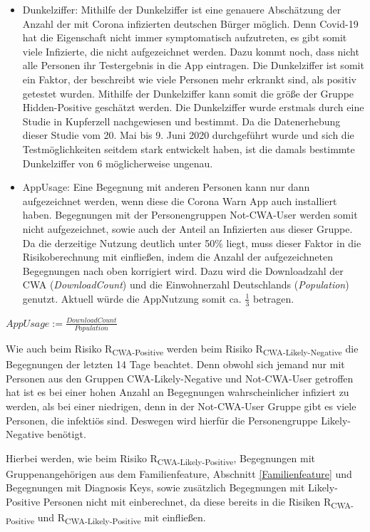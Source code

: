 \documentclass[conference,compsoc]{IEEEtran}
\begin{document}
\begin{itemize}
	\item Dunkelziffer: Mithilfe der Dunkelziffer ist eine genauere Abschätzung der Anzahl der mit Corona infizierten deutschen Bürger möglich. 
	Denn Covid-19 hat die Eigenschaft nicht immer symptomatisch aufzutreten, es gibt somit viele Infizierte, 
	die nicht aufgezeichnet werden. Dazu kommt noch, dass nicht alle Personen ihr Testergebnis in die App eintragen.
	Die Dunkelziffer ist somit  ein Faktor, der beschreibt wie viele Personen mehr erkrankt sind, 
	als positiv getestet wurden. Mithilfe der Dunkelziffer kann somit die größe der Gruppe Hidden-Positive geschätzt werden.
	Die Dunkelziffer wurde erstmals durch eine Studie in Kupferzell \cite{Dunkelziffer} nachgewiesen und bestimmt. 
	Da die Datenerhebung dieser Studie vom 20. Mai bis 9. Juni 2020 durchgeführt wurde und sich die Testmöglichkeiten seitdem stark entwickelt haben, 
	ist die damals bestimmte Dunkelziffer von 6 möglicherweise ungenau. 
	\item  AppUsage: Eine Begegnung mit anderen Personen kann nur dann aufgezeichnet werden, wenn diese die Corona Warn App auch installiert haben. 
	Begegnungen mit der Personengruppen Not-CWA-User werden somit nicht aufgezeichnet, sowie auch der Anteil an Infizierten aus dieser Gruppe. 
	Da die derzeitige Nutzung deutlich unter 50\% liegt, muss dieser Faktor in die Risikoberechnung mit einfließen, 
	indem die Anzahl der aufgezeichneten Begegnungen nach oben korrigiert wird. 
	Dazu wird die Downloadzahl der CWA (\textit{DownloadCount}) \cite{Downloads} und die Einwohnerzahl Deutschlands (\textit{Population}) \cite{Einwohnerzahl} genutzt. 
	Aktuell würde die AppNutzung somit ca. $\frac{1}{3}$ betragen.
\end{itemize}

\centerline{\text{ }}
\centerline{$AppUsage := \frac{DownloadCount}{Population}$}
\centerline{\text{ }}

Wie auch beim Risiko R\textsubscript{CWA-Positive} werden beim Risiko R\textsubscript{CWA-Likely-Negative} die Begegnungen der letzten 14 Tage beachtet.
Denn obwohl sich jemand nur mit Personen aus den Gruppen CWA-Likely-Negative und Not-CWA-User getroffen hat
ist es bei einer hohen Anzahl an Begegnungen wahrscheinlicher infiziert zu werden, als bei einer niedrigen, denn in der Not-CWA-User Gruppe gibt es viele Personen, die infektiös sind. 
Deswegen wird hierfür die Personengruppe Likely-Negative benötigt. 

Hierbei werden, wie beim Risiko R\textsubscript{CWA-Likely-Positive}, 
Begegnungen mit Gruppenangehörigen aus dem Familienfeature, Abschnitt \ref{Familienfeature} und Begegnungen mit Diagnosis Keys, 
sowie zusätzlich Begegnungen mit Likely-Positive Personen nicht mit einberechnet, 
da diese bereits in die Risiken R\textsubscript{CWA-Positive} und R\textsubscript{CWA-Likely-Positive} mit einfließen.
\end{document}
